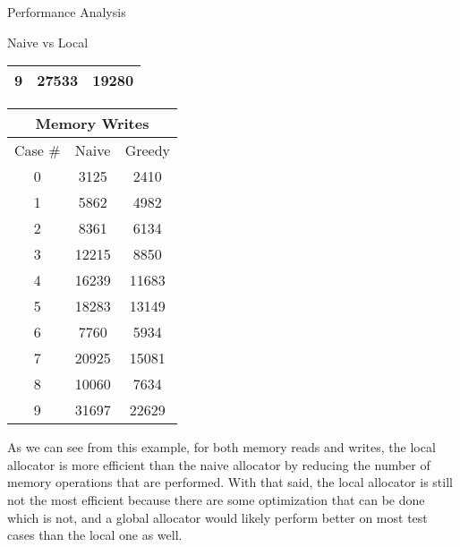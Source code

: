 \documentclass[letterpaper,12pt]{article}
\theoremstyle{definition}
\begin{document}
\begin{section}{Performance Analysis}
\begin{subsection}{Naive vs Local}
\begin{itemize}
\begin{table}[H]
\begin{minipage}{.4\textwidth}
\begin{tabular}{|c|c|c|}
                                9 & 27533 & 19280 \\
                                \hline
                            \end{tabular}
                        \end{minipage}
                        \hfill
                        \begin{minipage}{.4\textwidth}
                            \centering
                            \begin{tabular}{|c|c|c|}
                                \hline
                                \multicolumn{3}{|c|}{Memory Writes}\\
                                \hline
                                Case \# & Naive & Greedy \\
                                \hline
                                0 & 3125 & 2410 \\
                                \hline
                                1 & 5862 & 4982 \\
                                \hline
                                2 & 8361 & 6134 \\
                                \hline
                                3 & 12215 & 8850 \\
                                \hline
                                4 & 16239 & 11683 \\
                                \hline
                                5 & 18283 & 13149 \\
                                \hline
                                6 & 7760 & 5934 \\
                                \hline
                                7 & 20925 & 15081 \\
                                \hline
                                8 & 10060 & 7634 \\
                                \hline
                                9 & 31697 & 22629 \\
                                \hline
                            \end{tabular}
                        \end{minipage}
                    \end{table}
                    As we can see from this example, for both memory reads and writes, the local allocator is more efficient than the naive allocator by reducing the number of memory operations that are performed. With that said, the local allocator is still not the most efficient because there are some optimization that can be done which is not, and a global allocator would likely perform better on most test cases than the local one as well.

\end{itemize}
\end{subsection}
\end{section}
\end{document}
